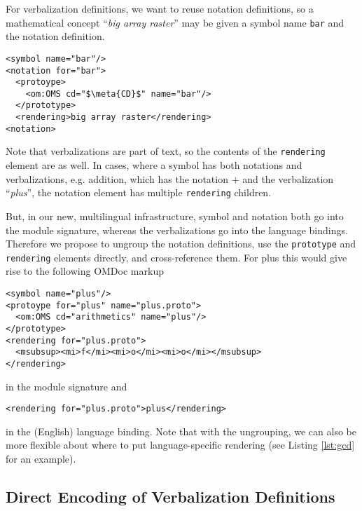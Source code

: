 \documentclass{bluenote}
\def\omdoc{\textsf{OMDoc}\xspace}
\def\lstomdoc{\lstinline[language={[1.3]OMDoc},mathescape]}
\def\nlex#1{``\emph{#1}''}
\def\meta#1{\ensuremath{\langle\kern-.2em\langle\text{#1}\rangle\kern-.2em\rangle}}
\begin{document}
For verbalization definitions, we want to reuse notation definitions, so a mathematical
concept \nlex{big array raster} may be given a symbol name \lstomdoc|bar| and the notation
definition. 
\begin{lstlisting}[language={[1.3]OMDoc},mathescape,
  label=lst:vd-classical,caption=A classical Verbalization Definition]
<symbol name="bar"/>
<notation for="bar">
  <protoype>
    <om:OMS cd="$\meta{CD}$" name="bar"/>
  </prototype>
  <rendering>big array raster</rendering>
<notation>
\end{lstlisting}
Note that verbalizations are part of text, so the contents of the \lstomdoc|rendering|
element are as well. In cases, where a symbol has both notations and verbalizations,
e.g. addition, which has the notation $+$ and the verbalization \nlex{plus}, the notation
element has multiple \lstomdoc|rendering| children. 

But, in our new, multilingual infrastructure, symbol and notation both go into the module
signature, whereas the verbalizations go into the language bindings. Therefore we propose
to ungroup the notation definitions, use the \lstomdoc|prototype| and \lstomdoc|rendering|
elements directly, and cross-reference them. For plus this would give rise to the following
\omdoc markup 

\begin{lstlisting}[language={[1.3]OMDoc},mathescape, 
  label=lst:nd-new,caption=Proposed Notation Definition]
<symbol name="plus"/>
<protoype for="plus" name="plus.proto">
  <om:OMS cd="arithmetics" name="plus"/>
</prototype>
<rendering for="plus.proto">
  <msubsup><mi>f</mi><mi>o</mi><mi>o</mi></msubsup>
</rendering>
\end{lstlisting}
 
\noindent in the module signature and 

\begin{lstlisting}[language={[1.3]OMDoc},mathescape,
  label=lst:vd-classical,caption=Proposed Verbalization Definition]
<rendering for="plus.proto">plus</rendering>
\end{lstlisting}
\noindent in the (English) language binding. Note that with the ungrouping, we can also be
more flexible about where to put language-specific rendering (see Listing \ref{lst:gcd}
for an example).

\subsection{Direct \protect\sTeX Encoding of Verbalization Definitions}
\end{document}
